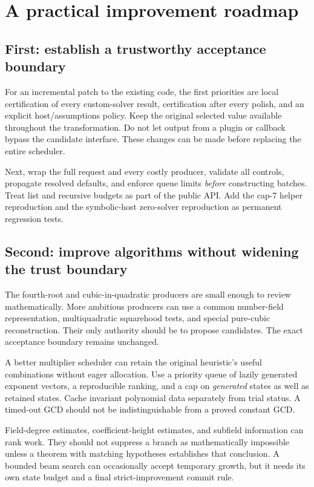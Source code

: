 \documentclass[11pt,letterpaper]{article}
\theoremstyle{definition}
\begin{document}
\section{A practical improvement roadmap}\label{sec:roadmap}

\subsection{First: establish a trustworthy acceptance boundary}

For an incremental patch to the existing code, the first priorities are local certification of every custom-solver result, certification after every polish, and an explicit host/assumptions policy. Keep the original selected value available throughout the transformation. Do not let output from a plugin or callback bypass the candidate interface. These changes can be made before replacing the entire scheduler.

Next, wrap the full request and every costly producer, validate all controls, propagate resolved defaults, and enforce queue limits \emph{before} constructing batches. Treat list and recursive budgets as part of the public API. Add the cap-$7$ helper reproduction and the symbolic-host zero-solver reproduction as permanent regression tests.

\subsection{Second: improve algorithms without widening the trust boundary}

The fourth-root and cubic-in-quadratic producers are small enough to review mathematically. More ambitious producers can use a common number-field representation, multiquadratic squarehood tests, and special pure-cubic reconstruction. Their only authority should be to propose candidates. The exact acceptance boundary remains unchanged.

A better multiplier scheduler can retain the original heuristic's useful combinations without eager allocation. Use a priority queue of lazily generated exponent vectors, a reproducible ranking, and a cap on \emph{generated} states as well as retained states. Cache invariant polynomial data separately from trial status. A timed-out GCD should not be indistinguishable from a proved constant GCD.

Field-degree estimates, coefficient-height estimates, and subfield information can rank work. They should not suppress a branch as mathematically impossible unless a theorem with matching hypotheses establishes that conclusion. A bounded beam search can occasionally accept temporary growth, but it needs its own state budget and a final strict-improvement commit rule.
\end{document}
